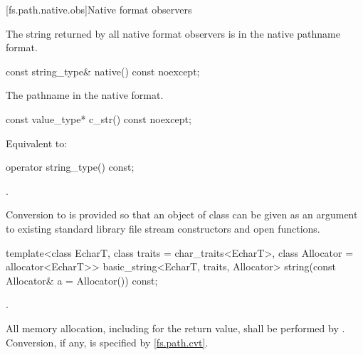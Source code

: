 [fs.path.native.obs]{Native format observers}

\pnum
The string returned by all native format observers is in the native pathname format.

%
\begin{itemdecl}
const string_type& native() const noexcept;
\end{itemdecl}

\begin{itemdescr}
\pnum
\returns The pathname in the native format.
\end{itemdescr}

%
\begin{itemdecl}
const value_type* c_str() const noexcept;
\end{itemdecl}

\begin{itemdescr}
\pnum
\effects Equivalent to: 
\end{itemdescr}

%
\begin{itemdecl}
operator string_type() const;
\end{itemdecl}

\begin{itemdescr}
\pnum
\returns {}.

\pnum
\begin{note} Conversion to  is provided so that an
  object of class  can be given as an argument to existing
  standard library file stream constructors and open functions. \end{note}
\end{itemdescr}

%
\begin{itemdecl}
template<class EcharT, class traits = char_traits<EcharT>,
         class Allocator = allocator<EcharT>>
  basic_string<EcharT, traits, Allocator>
    string(const Allocator& a = Allocator()) const;
\end{itemdecl}

\begin{itemdescr}
\pnum
\returns {}.

\pnum
\remarks All memory allocation, including for the return value, shall
be performed by . Conversion, if any, is specified by
\ref{fs.path.cvt}.
\end{itemdescr}

